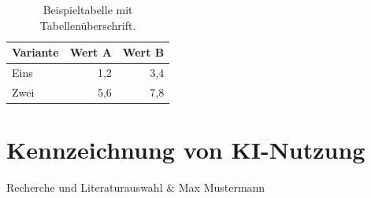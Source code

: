 \begin{table}[htbp]
  \centering
  \caption{Beispieltabelle mit Tabellenüberschrift.}
  \label{tab:a1-ergebnisse}
  \begin{tabular}{lrr}
    \toprule
    Variante & Wert A & Wert B \\
    \midrule
    Eins     & 1,2    & 3,4    \\
    Zwei     & 5,6    & 7,8    \\
    \bottomrule
  \end{tabular}
\end{table}

\section{Kennzeichnung von KI-Nutzung}

\begin{beitraege}
  Recherche und Literaturauswahl                 & Max Mustermann \\
\end{beitraege}
